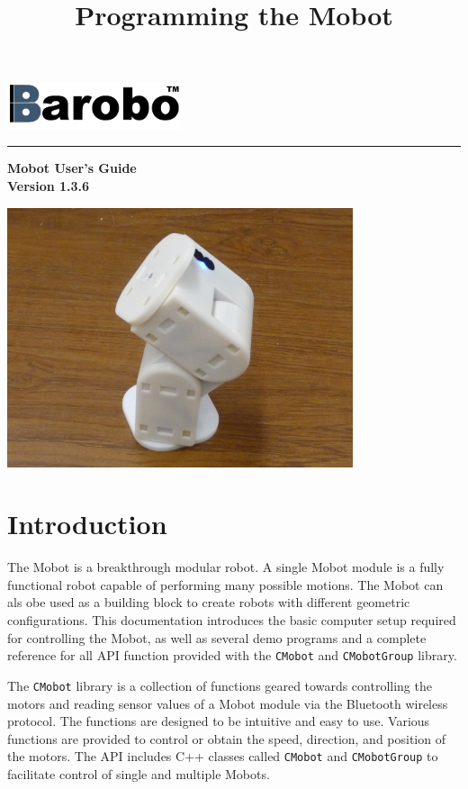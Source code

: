 \documentclass{article}
\title{Programming the Mobot}
\begin{document}
\includegraphics[width=2in]{images/Barobo.png}
\hrule
\begin{center}
\vspace*{2.5cm}
{\Huge\sf\bf Mobot User's Guide}\\
\vspace*{2.5cm}
{\Large\bf Version 1.3.6}
\vspace{4.5cm}

\includegraphics[width=4in]{images/Mobot_Camera_Stand.JPG}
\end{center}


\newpage
\tableofcontents
\newpage
\section{Introduction}
The Mobot is a breakthrough modular robot. A single Mobot module is a fully 
functional robot capable of performing many possible motions. The Mobot
can als obe used as a building block to create robots with different
geometric configurations. 
This documentation introduces the basic computer setup required for controlling 
the Mobot, as well as several demo programs and a complete reference for all
API function provided with the \texttt{CMobot} and \texttt{CMobotGroup} library.

The \texttt{CMobot} library is a collection of functions geared towards
controlling the motors and reading sensor values of a Mobot module via the
Bluetooth wireless protocol. The functions are designed to be intuitive
and easy to use. Various functions are provided to control or obtain the speed,
direction, and position of the motors. The API includes C++ classes called
\texttt{CMobot} and \texttt{CMobotGroup} to facilitate control of 
single and multiple Mobots.
\end{document}
